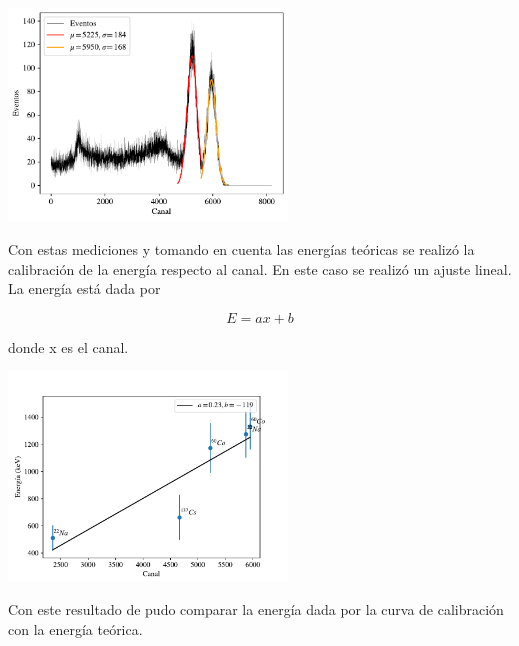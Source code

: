 \documentclass[a4paper, onecolumn]{article}
\begin{document}
		\begin{center}
			\includegraphics[width=210pt]{img/nai_33_co_60.pdf}
		\end{center}

		Con estas mediciones y tomando en cuenta las energías teóricas se realizó la calibración de la energía respecto al canal. En este caso se realizó un ajuste lineal. La energía está dada por

		$$
		E=ax+b
		$$

		donde x es el canal.

		\begin{center}
			\includegraphics[width=210pt]{img/cal_nai_33.pdf}
		\end{center}

		Con este resultado de pudo comparar la energía dada por la curva de calibración con la energía teórica.
\end{document}
